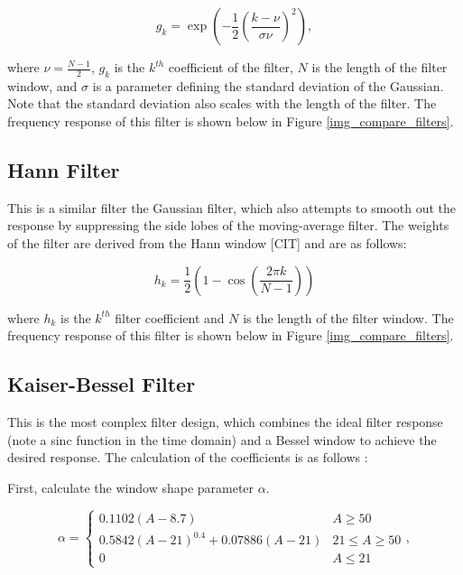                 \begin{equation}
                    g_k = \exp(-\frac{1}{2}(\frac{k - \nu}{\sigma \nu})^2),
                \end{equation}

                where $\nu = \frac{N-1}{2}$, $g_k$ is the $k^{th}$ coefficient of the filter, $N$ is the length of the filter window, and $\sigma$ is a parameter defining the standard deviation of the Gaussian. Note that the standard deviation also scales with the length of the filter. The frequency response of this filter is shown below in Figure \ref{img_compare_filters}.

            \subsection{Hann Filter}

                This is a similar filter the Gaussian filter, which also attempts to smooth out the response by suppressing the side lobes of the moving-average filter. The weights of the filter are derived from the Hann window [CIT] and are as follows: 

                \begin{equation}
                    h_k = \frac{1}{2}(1 - \cos(\frac{2\pi k}{N - 1}))
                \end{equation}

                where $h_k$ is the $k^{th}$ filter coefficient and $N$ is the length of the filter window. The frequency response of this filter is shown below in Figure \ref{img_compare_filters}. 

            \subsection{Kaiser-Bessel Filter}

                This is the most complex filter design, which combines the ideal filter response (note a sinc function in the time domain) and a Bessel window to achieve the desired response. The calculation of the coefficients is as follows \cite{kaiser-bessel}:

                First, calculate the window shape parameter $\alpha$. 

                \begin{equation}
                    \alpha = 
                        \begin{cases}
                            0.1102(A - 8.7) & A \ge 50 \\
                            0.5842(A-21)^{0.4} + 0.07886(A-21) & 21 \leq A \geq 50 \\
                            0 & A \le 21
                        \end{cases},
                \end{equation}

